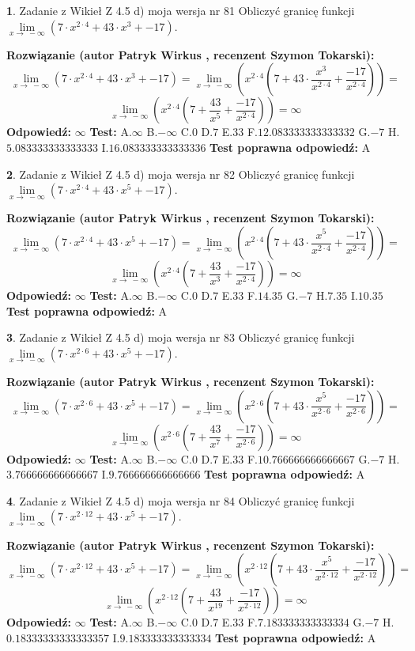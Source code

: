 \documentclass[12pt, a4paper]{article}
\theoremstyle{definition} %
\newtheorem{zad}{}
\newcommand{\zadStart}[1]{\begin{zad}#1\newline}
\newcommand{\zadStop}{\end{zad}}
\newcommand{\rozwStart}[2]{\noindent \textbf{Rozwiązanie (autor #1 , recenzent #2): }\newline}
\newcommand{\rozwStop}{\newline}
\newcommand{\odpStart}{\noindent \textbf{Odpowiedź:}\newline}
\newcommand{\odpStop}{\newline}
\newcommand{\testStart}{\noindent \textbf{Test:}\newline}
\newcommand{\testStop}{\newline}
\newcommand{\kluczStart}{\noindent \textbf{Test poprawna odpowiedź:}\newline}
\newcommand{\kluczStop}{\newline}
\begin{document}
\zadStart{Zadanie z Wikieł Z 4.5 d) moja wersja nr 81}
Obliczyć granicę funkcji  $\lim\limits_{x\to\ -\infty}(7 \cdot x^{2\cdot4}+43 \cdot x^{3}+-17)$.
\zadStop
\rozwStart{Patryk Wirkus}{Szymon Tokarski}
$$\lim\limits_{x\to\ -\infty}(7 \cdot x^{2\cdot4}+43 \cdot x^{3}+-17) = \lim\limits_{x\to\ -\infty}(x^{2\cdot4}(7 +43 \cdot \frac{x^{3}}{x^{2\cdot4}}+\frac{-17}{x^{2\cdot4}})) =$$ $$\lim\limits_{x\to\ -\infty}(x^{2\cdot4}(7 +\frac{43}{x^{5}}+\frac{-17}{x^{2\cdot4}})) =\infty$$
\rozwStop
\odpStart
$\infty$
\odpStop
\testStart
A.$\infty$ B.$-\infty$ C.$0$ D.$7$ E.$33$
F.$12.083333333333332$ G.$-7$
H.$5.083333333333333$
I.$16.083333333333336$
\testStop
\kluczStart
A
\kluczStop



\zadStart{Zadanie z Wikieł Z 4.5 d) moja wersja nr 82}
Obliczyć granicę funkcji  $\lim\limits_{x\to\ -\infty}(7 \cdot x^{2\cdot4}+43 \cdot x^{5}+-17)$.
\zadStop
\rozwStart{Patryk Wirkus}{Szymon Tokarski}
$$\lim\limits_{x\to\ -\infty}(7 \cdot x^{2\cdot4}+43 \cdot x^{5}+-17) = \lim\limits_{x\to\ -\infty}(x^{2\cdot4}(7 +43 \cdot \frac{x^{5}}{x^{2\cdot4}}+\frac{-17}{x^{2\cdot4}})) =$$ $$\lim\limits_{x\to\ -\infty}(x^{2\cdot4}(7 +\frac{43}{x^{3}}+\frac{-17}{x^{2\cdot4}})) =\infty$$
\rozwStop
\odpStart
$\infty$
\odpStop
\testStart
A.$\infty$ B.$-\infty$ C.$0$ D.$7$ E.$33$
F.$14.35$ G.$-7$
H.$7.35$
I.$10.35$
\testStop
\kluczStart
A
\kluczStop



\zadStart{Zadanie z Wikieł Z 4.5 d) moja wersja nr 83}
Obliczyć granicę funkcji  $\lim\limits_{x\to\ -\infty}(7 \cdot x^{2\cdot6}+43 \cdot x^{5}+-17)$.
\zadStop
\rozwStart{Patryk Wirkus}{Szymon Tokarski}
$$\lim\limits_{x\to\ -\infty}(7 \cdot x^{2\cdot6}+43 \cdot x^{5}+-17) = \lim\limits_{x\to\ -\infty}(x^{2\cdot6}(7 +43 \cdot \frac{x^{5}}{x^{2\cdot6}}+\frac{-17}{x^{2\cdot6}})) =$$ $$\lim\limits_{x\to\ -\infty}(x^{2\cdot6}(7 +\frac{43}{x^{7}}+\frac{-17}{x^{2\cdot6}})) =\infty$$
\rozwStop
\odpStart
$\infty$
\odpStop
\testStart
A.$\infty$ B.$-\infty$ C.$0$ D.$7$ E.$33$
F.$10.766666666666667$ G.$-7$
H.$3.766666666666667$
I.$9.766666666666666$
\testStop
\kluczStart
A
\kluczStop



\zadStart{Zadanie z Wikieł Z 4.5 d) moja wersja nr 84}
Obliczyć granicę funkcji  $\lim\limits_{x\to\ -\infty}(7 \cdot x^{2\cdot12}+43 \cdot x^{5}+-17)$.
\zadStop
\rozwStart{Patryk Wirkus}{Szymon Tokarski}
$$\lim\limits_{x\to\ -\infty}(7 \cdot x^{2\cdot12}+43 \cdot x^{5}+-17) = \lim\limits_{x\to\ -\infty}(x^{2\cdot12}(7 +43 \cdot \frac{x^{5}}{x^{2\cdot12}}+\frac{-17}{x^{2\cdot12}})) =$$ $$\lim\limits_{x\to\ -\infty}(x^{2\cdot12}(7 +\frac{43}{x^{19}}+\frac{-17}{x^{2\cdot12}})) =\infty$$
\rozwStop
\odpStart
$\infty$
\odpStop
\testStart
A.$\infty$ B.$-\infty$ C.$0$ D.$7$ E.$33$
F.$7.183333333333334$ G.$-7$
H.$0.18333333333333357$
I.$9.183333333333334$
\testStop
\kluczStart
A
\kluczStop
\end{document}
